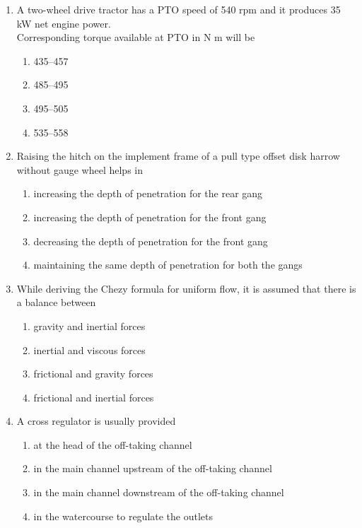 \documentclass[journal]{IEEEtran}
\numberwithin{equation}{enumi}
\numberwithin{figure}{enumi}
\begin{document}
\begin{enumerate}
    \item A two-wheel drive tractor has a PTO speed of 540 rpm and it produces 35 kW net engine power. \\
    Corresponding torque available at PTO in N m will be \hfill{}
    \begin{multicols}{4}
    \begin{enumerate}
    \item 435--457
    \item 485--495
    \item 495--505
    \item 535--558
    \end{enumerate}
    \end{multicols}
    

    \item Raising the hitch on the implement frame of a pull type offset disk harrow without gauge wheel helps in  \hfill{}
    \begin{enumerate}
    \item  increasing the depth of penetration for the rear gang 
    \item increasing the depth of penetration for the front gang 
    \item decreasing the depth of penetration for the front gang 
    \item maintaining the same depth of penetration for both the gangs
    \end{enumerate}




    \item While deriving the Chezy formula for uniform flow, it is assumed that there is a balance between
     \hfill{}
    \begin{enumerate}
    \item gravity and inertial forces
    \item inertial and viscous forces
    \item frictional and gravity forces
    \item frictional and inertial forces
    \end{enumerate}



    \item A cross regulator is usually provided
    \hfill{}
    \begin{enumerate}
    \item at the head of the off-taking channel
    \item in the main channel upstream of the off-taking channel
    \item in the main channel downstream of the off-taking channel
    \item in the watercourse to regulate the outlets
    \end{enumerate}



\end{enumerate}
\end{document}
